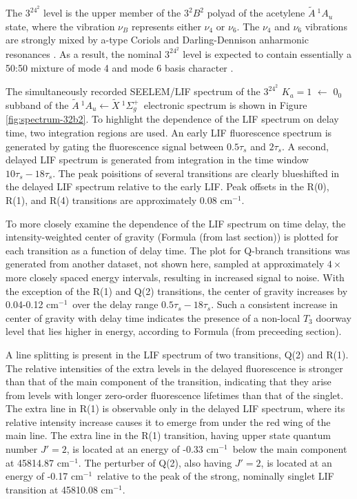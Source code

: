 \documentclass[12pt]{mitthesis}
\newcommand{\rcm}{cm$^{-1}$}
\newcommand{\astate}{$
  \tilde{A} \: ^1\!A_u
  $}
\newcommand{\AtoX}{$
  \tilde{A} \: ^1\!A_u 
  \leftarrow 
  \tilde{X} \: ^1\Sigma_g^+
  $}
\newcommand{\Ka}[1]{$K_a\!\!=\!#1$}
\begin{document}
The $3^24^2$ level is the upper member of the $3^2B^2$ polyad of the
acetylene \astate state, where the vibration $\nu_B$ represents either
$\nu_4$ or $\nu_6$.  The $\nu_4$ and $\nu_6$ vibrations are strongly
mixed by a-type Coriols and Darling-Dennison anharmonic resonances
\cite{merer08}.  As a result, the nominal $3^24^2$ level is expected
to contain essentially a 50:50 mixture of mode 4 and mode 6 basis
character \cite{merer08, virgo07}.

The simultaneously recorded SEELEM/LIF spectrum of the $3^24^2$ \Ka{1}
$\leftarrow$ $0_0$ subband of the \AtoX\ electronic spectrum is shown
in Figure \ref{fig:spectrum-32b2}. To highlight the dependence of the
LIF spectrum on delay time, two integration regions are used.  An
early LIF fluorescence spectrum is generated by gating the
fluorescence signal between $0.5\tau_s$ and $2\tau_s$.  A second,
delayed LIF spectrum is generated from integration in the time window
$10\tau_s-18\tau_s$.  The peak poisitions of several transitions are
clearly blueshifted in the delayed LIF spectrum relative to the early
LIF.  Peak offsets in the R(0), R(1), and R(4) transitions are
approximately 0.08 \rcm.

To more closely examine the dependence of the LIF spectrum on time
delay, the intensity-weighted center of gravity (Formula (from last
section)) is plotted for each transition as a function of delay time.
The plot for Q-branch transitions was generated from another dataset,
not shown here, sampled at approximately $4 \times$ more closely
spaced energy intervals, resulting in increased signal to noise.  With
the exception of the R(1) and Q(2) transitions, the center of gravity
increases by 0.04-0.12 \rcm\ over the delay range
$0.5\tau_s-18\tau_s$.  Such a consistent increase in center of gravity
with delay time indicates the presence of a non-local $T_3$ doorway
level that lies higher in energy, according to Formula (from
preceeding section).


A line splitting is present in the LIF spectrum of two transitions,
Q(2) and R(1).  The relative intensities of the extra levels in the
delayed fluorescence is stronger than that of the main component of
the transition, indicating that they arise from levels with longer
zero-order fluorescence lifetimes than that of the singlet.  The extra
line in R(1) is observable only in the delayed LIF spectrum, where its
relative intensity increase causes it to emerge from under the red
wing of the main line.  The extra line in the R(1) transition, having
upper state quantum number $J'=2$, is located at an energy of -0.33
\rcm\ below the main component at 45814.87 \rcm.  The perturber of
Q(2), also having $J'=2$, is located at an energy of -0.17 \rcm\
relative to the peak of the strong, nominally singlet LIF transition
at 45810.08 \rcm.
\end{document}
